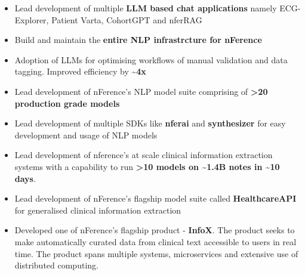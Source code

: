 \documentclass[10pt,a4paper,ragged2e,withhyper]{altacv}
\begin{document}
\begin{paracol}{2}


\begin{itemize}
\item Lead development of multiple \textbf{LLM based chat applications} namely ECG-Explorer, Patient Varta, CohortGPT and nferRAG
\item Build and maintain the \textbf{entire NLP infrastrcture for nFerence}
\item Adoption of LLMs for optimising workflows of manual validation and data tagging. Improved efficiency by \textbf{\textasciitilde 4x}
\item Lead development of nFerence's NLP model suite comprising of \textbf{>20 production grade models}
\end{itemize}

\divider

\begin{itemize}
\item Lead development of multiple SDKs like \textbf{nferai} and \textbf{synthesizer} for easy development and usage of NLP models
\item Lead development of nference's at scale clinical information extraction systems with a capability to run \textbf{>10 models on \textasciitilde 1.4B notes in \textasciitilde 10 days}.
\item Lead development of nFerence's flagship model suite called \textbf{HealthcareAPI} for generalised clinical information extraction
\end{itemize}

\divider

\begin{itemize}
  \item Developed one of nFerence’s flagship product - \textbf{InfoX}. The product seeks to make automatically curated data from clinical text accessible to users in real time. The product spans multiple systems, microservices and extensive use of distributed computing.
\end{itemize}

\divider


\end{paracol}
\end{document}
